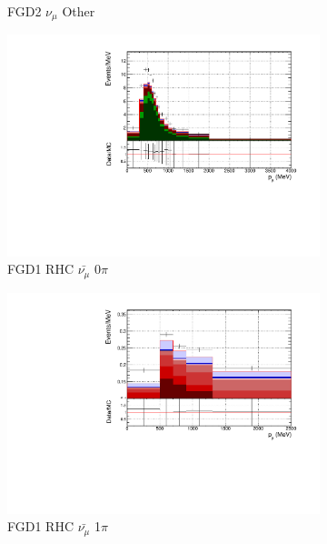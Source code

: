 \begin{figure}
\begin{subfigure}{.32\textwidth}
  \caption{FGD2 $\nu_{\mu}$ Other}
  \label{fig:pstack_FGD2_numuCC_other}
\end{subfigure}
\centering
\begin{subfigure}{.32\textwidth}
  \centering
  \includegraphics[width=0.95\linewidth]{figs/FGD1_anti-numuCC_0pi_p}
  \caption{FGD1 RHC $\bar{\nu_{\mu}}$ 0$\pi$}
  \label{fig:pstack_FGD1_anti-numuCC_0pi}
\end{subfigure}
\begin{subfigure}{.32\textwidth}
  \centering
  \includegraphics[width=0.95\linewidth]{figs/FGD1_anti-numuCC_1pi_p}
  \caption{FGD1 RHC $\bar{\nu_{\mu}}$ 1$\pi$}
  \label{fig:pstack_pstack_FGD1_anti-numuCC_1pi}
\end{subfigure}
\begin{subfigure}{.32\textwidth}
  \centering

\end{subfigure}
\end{figure}
